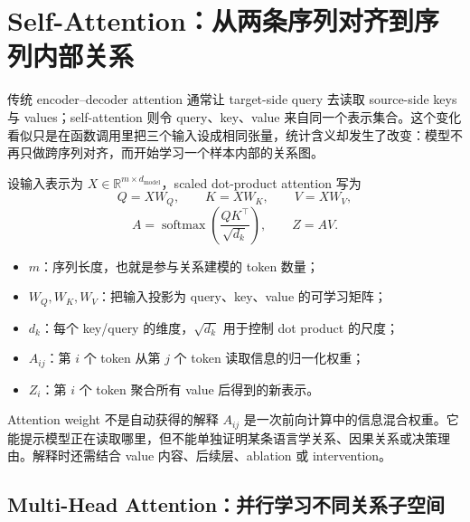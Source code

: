 \section{Self-Attention：从两条序列对齐到序列内部关系}

传统 encoder--decoder attention 通常让 target-side query 去读取 source-side keys 与 values；self-attention 则令 query、key、value 来自同一个表示集合。这个变化看似只是在函数调用里把三个输入设成相同张量，统计含义却发生了改变：模型不再只做跨序列对齐，而开始学习一个样本内部的关系图。


设输入表示为 $X\in\mathbb{R}^{m\times d_{\mathrm{model}}}$，scaled dot-product attention 写为
\[
Q=XW_Q,\qquad K=XW_K,\qquad V=XW_V,
\]
\[
A=\operatorname{softmax}\!\left(\frac{QK^{\top}}{\sqrt{d_k}}\right),
\qquad Z=AV.
\]

\begin{itemize}
  \item $m$：序列长度，也就是参与关系建模的 token 数量；
  \item $W_Q,W_K,W_V$：把输入投影为 query、key、value 的可学习矩阵；
  \item $d_k$：每个 key/query 的维度，$\sqrt{d_k}$ 用于控制 dot product 的尺度；
  \item $A_{ij}$：第 $i$ 个 token 从第 $j$ 个 token 读取信息的归一化权重；
  \item $Z_i$：第 $i$ 个 token 聚合所有 value 后得到的新表示。
\end{itemize}


\begin{warningbox}{Attention weight 不是自动获得的解释}
$A_{ij}$ 是一次前向计算中的信息混合权重。它能提示模型正在读取哪里，但不能单独证明某条语言学关系、因果关系或决策理由。解释时还需结合 value 内容、后续层、ablation 或 intervention。
\end{warningbox}

\subsection{Multi-Head Attention：并行学习不同关系子空间}

